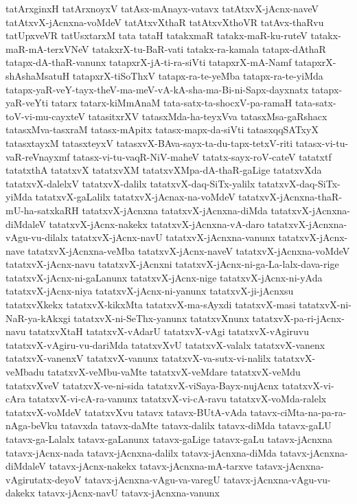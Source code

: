 {tatArxginxH
tatArxnoyxV
tatAsx-mAnayx-vatavx
tatAtxvX-jAcnx-naveV
tatAtxvX-jAcnxna-voMdeV
tatAtxvXthaR
tatAtxvXthoVR
tatAvx-thaRvu
tatUpxveVR
tatUsxtarxM
tata
tataH
tatakxmaR
tatakx-maR-ku-ruteV
tatakx-maR-mA-terxVNeV
tatakxrX-tu-BaR-vati
tatakx-ra-kamala
tatapx-dAthaR
tatapx-dA-thaR-vanunx
tatapxrX-jA-ti-ra-siVti
tatapxrX-mA-Namf
tatapxrX-shAshaMsatuH
tatapxrX-tiSoThxV
tatapx-ra-te-yeMba
tatapx-ra-te-yiMda
tatapx-yaR-veY-tayx-theV-ma-meV-vA-kA-sha-ma-Bi-ni-Sapx-dayxnatx
tatapx-yaR-veYti
tatarx
tatarx-kiMmAnaM
tata-satx-ta-shocxV-pa-ramaH
tata-satx-toV-vi-mu-cayxteV
tatasitxrXV
tatasxMda-ha-teyxVva
tatasxMsa-gaRshacx
tatasxMva-tasxraM
tatasx-mApitx
tatasx-mapx-da-siVti
tatasxqqSATxyX
tatasxtayxM
tatasxteyxV
tatasxvX-BAva-sayx-ta-du-tapx-tetxV-riti
tatasx-vi-tu-vaR-reVnayxmf
tatasx-vi-tu-vaqR-NiV-maheV
tatatx-sayx-roV-cateV
tatatxtf
tatatxthA
tatatxvX
tatatxvXM
tatatxvXMpa-dA-thaR-gaLige
tatatxvXda
tatatxvX-dalelxV
tatatxvX-dalilx
tatatxvX-daq-SiTx-yalilx
tatatxvX-daq-SiTx-yiMda
tatatxvX-gaLalilx
tatatxvX-jAcnax-na-voMdeV
tatatxvX-jAcnxna-thaR-mU-ha-satxkaRH
tatatxvX-jAcnxna
tatatxvX-jAcnxna-diMda
tatatxvX-jAcnxna-diMdaleV
tatatxvX-jAcnx-nakekx
tatatxvX-jAcnxna-vA-daro
tatatxvX-jAcnxna-vAgu-vu-dilalx
tatatxvX-jAcnx-navU
tatatxvX-jAcnxna-vanunx
tatatxvX-jAcnx-nave
tatatxvX-jAcnxna-veMba
tatatxvX-jAcnx-naveV
tatatxvX-jAcnxna-voMdeV
tatatxvX-jAcnx-navu
tatatxvX-jAcnxni
tatatxvX-jAcnx-ni-ga-La-lalx-dava-rige
tatatxvX-jAcnx-ni-gaLanunx
tatatxvX-jAcnx-nige
tatatxvX-jAcnx-ni-yAda
tatatxvX-jAcnx-niya
tatatxvX-jAcnx-ni-yanunx
tatatxvX-ji-jAcnxsu
tatatxvXkekx
tatatxvX-kikxMta
tatatxvX-ma-sAyxdi
tatatxvX-masi
tatatxvX-ni-NaR-ya-kAkxgi
tatatxvX-ni-SeThx-yanunx
tatatxvXnunx
tatatxvX-pa-ri-jAcnx-navu
tatatxvXtaH
tatatxvX-vAdarU
tatatxvX-vAgi
tatatxvX-vAgiruvu
tatatxvX-vAgiru-vu-dariMda
tatatxvXvU
tatatxvX-valalx
tatatxvX-vanenx
tatatxvX-vanenxV
tatatxvX-vanunx
tatatxvX-va-sutx-vi-nalilx
tatatxvX-veMbadu
tatatxvX-veMbu-vaMte
tatatxvX-veMdare
tatatxvX-veMdu
tatatxvXveV
tatatxvX-ve-ni-sida
tatatxvX-viSaya-Bayx-nujAcnx
tatatxvX-vi-cAra
tatatxvX-vi-cA-ra-vanunx
tatatxvX-vi-cA-ravu
tatatxvX-voMda-ralelx
tatatxvX-voMdeV
tatatxvXvu
tatavx
tatavx-BUtA-vAda
tatavx-ciMta-na-pa-ra-nAga-beVku
tatavxda
tatavx-daMte
tatavx-dalilx
tatavx-diMda
tatavx-gaLU
tatavx-ga-Lalalx
tatavx-gaLanunx
tatavx-gaLige
tatavx-gaLu
tatavx-jAcnxna
tatavx-jAcnx-nada
tatavx-jAcnxna-dalilx
tatavx-jAcnxna-diMda
tatavx-jAcnxna-diMdaleV
tatavx-jAcnx-nakekx
tatavx-jAcnxna-mA-tarxve
tatavx-jAcnxna-vAgirutatx-deyoV
tatavx-jAcnxna-vAgu-va-varegU
tatavx-jAcnxna-vAgu-vu-dakekx
tatavx-jAcnx-navU
tatavx-jAcnxna-vanunx
}

